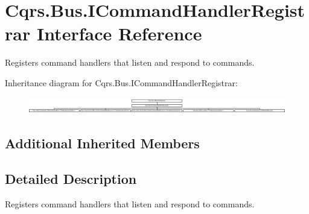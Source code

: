 \hypertarget{interfaceCqrs_1_1Bus_1_1ICommandHandlerRegistrar}{}\section{Cqrs.\+Bus.\+I\+Command\+Handler\+Registrar Interface Reference}
\label{interfaceCqrs_1_1Bus_1_1ICommandHandlerRegistrar}


Registers command handlers that listen and respond to commands.  


Inheritance diagram for Cqrs.\+Bus.\+I\+Command\+Handler\+Registrar\+:\begin{figure}[H]
\begin{center}
\leavevmode
\includegraphics[height=0.725702cm]{interfaceCqrs_1_1Bus_1_1ICommandHandlerRegistrar}
\end{center}
\end{figure}
\subsection*{Additional Inherited Members}


\subsection{Detailed Description}
Registers command handlers that listen and respond to commands. 

